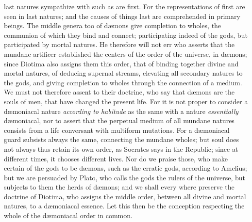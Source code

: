 \documentclass[12pt]{article}
\begin{document}
last natures sympathize with such as are first. For the representations of
first are seen in last natures; and the causes of things last are comprehended
in primary beings. The middle genera too of d{\ae}mons give completion to
wholes, the communion of which they bind and connect; participating indeed of
the gods, but participated by mortal natures. He therefore will not err who
asserts that the mundane artificer established the centers of the order of the
universe, in d{\ae}mons; since Diotima also assigns them this order, that of
binding together divine and mortal natures, of deducing supernal streams,
elevating all secondary natures to the gods, and giving completion to wholes
through the connection of a medium. We must not therefore assent to their
doctrine, who say that d{\ae}mons are the souls of men, that have changed the
present life. For it is not proper to consider a d{\ae}moniacal nature
\textit{according to habitude} as the same with a nature \textit{essentially}
d{\ae}moniacal, nor to assert that the perpetual medium of all mundane natures
consists from a life conversant with multiform mutations. For a d{\ae}moniacal
guard subsists always the same, connecting the mundane wholes; but soul does
not always thus retain its own order, as Socrates says in the Republic; since
at different times, it chooses different lives. Nor do we praise those, who
make certain of the gods to be d{\ae}mons, such as the erratic gods, according
to Amelius; but we are persuaded by Plato, who calls the gods the rulers of the
universe, but subjects to them the herds of d{\ae}mons; and we shall every
where preserve the doctrine of Diotima, who assigns the middle order, between
all divine and mortal natures, to a d{\ae}moniacal essence. Let this then be
the conception respecting the whole of the d{\ae}moniacal order in common.
\end{document}
